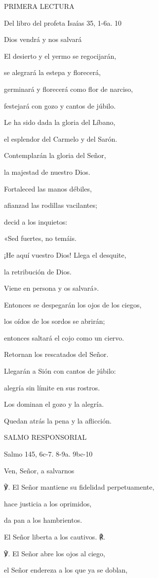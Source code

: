 PRIMERA LECTURA

Del libro del profeta Isaías 35, 1-6a. 10

Dios vendrá y nos salvará

El desierto y el yermo se regocijarán,

se alegrará la estepa y florecerá,

germinará y florecerá como flor de narciso,

festejará con gozo y cantos de júbilo.

Le ha sido dada la gloria del Líbano,

el esplendor del Carmelo y del Sarón.

Contemplarán la gloria del Señor,

la majestad de nuestro Dios.

Fortaleced las manos débiles,

afianzad las rodillas vacilantes;

decid a los inquietos:

«Sed fuertes, no temáis.

¡He aquí vuestro Dios! Llega el desquite,

la retribución de Dios.

Viene en persona y os salvará».

Entonces se despegarán los ojos de los ciegos,

los oídos de los sordos se abrirán;

entonces saltará el cojo como un ciervo.

Retornan los rescatados del Señor.

Llegarán a Sión con cantos de júbilo:

alegría sin límite en sus rostros.

Los dominan el gozo y la alegría.

Quedan atrás la pena y la aflicción.

SALMO RESPONSORIAL

Salmo 145, 6c-7. 8-9a. 9bc-10

Ven, Señor, a salvarnos

℣. El Señor mantiene su fidelidad perpetuamente,

hace justicia a los oprimidos,

da pan a los hambrientos.

El Señor liberta a los cautivos. ℟.

℣. El Señor abre los ojos al ciego,

el Señor endereza a los que ya se doblan,

